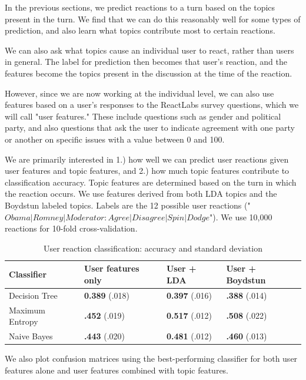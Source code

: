
In the previous sections, we predict reactions to a turn based on the topics present in the turn. We find that we can do this reasonably well for some types of prediction, and also learn what topics contribute most to certain reactions.

We can also ask what topics cause an individual user to react, rather than users in general. The label for prediction then becomes that user's reaction, and the features become the topics present in the discussion at the time of the reaction.

However, since we are now working at the individual level, we can also use features based on a user's responses to the ReactLabs survey questions, which we will call "user features." These include questions such as gender and political party, and also questions that ask the user to indicate agreement with one party or another on specific issues with a value between 0 and 100.

We are primarily interested in 1.) how well we can predict user reactions given user features and topic features, and 2.) how much topic features contribute to classification accuracy. Topic features are determined based on the turn in which the reaction occurs. We use features derived from both LDA topics and the Boydstun labeled topics. Labels are the 12 possible user reactions ("$Obama|Romney|Moderator : Agree|Disagree|Spin|Dodge$"). We use 10,000 reactions for 10-fold cross-validation.

\begin{table}[H]
\begin{centering}
\begin{tabular}{ l | l | l | l }
Classifier & User features only & User + LDA & User + Boydstun \\
\hline
Decision Tree & \textbf{0.389} (.018) & \textbf{0.397} (.016) &  \textbf{.388} (.014) \\
Maximum Entropy & \textbf{.452} (.019) & \textbf{0.517} (.012) &  \textbf{.508} (.022) \\
Naive Bayes & \textbf{.443} (.020) & \textbf{0.481} (.012) &  \textbf{.460} (.013) \\
\end{tabular}
\caption{User reaction classification: accuracy and standard deviation}
\end{centering}
\end{table}

We also plot confusion matrices using the best-performing classifier for both user features alone and user features combined with topic features.

